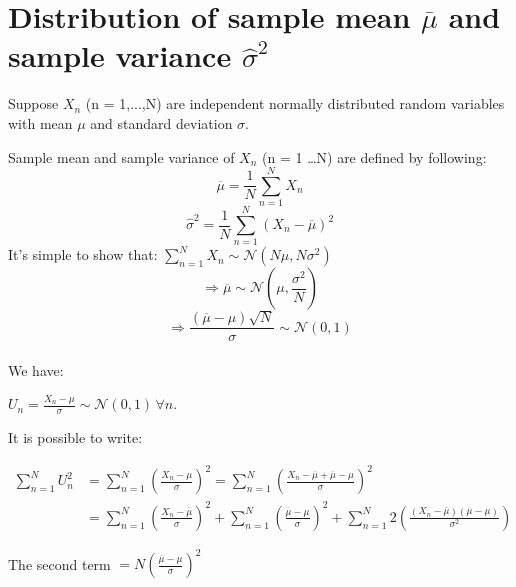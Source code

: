 \section {Distribution of sample mean $\overline \mu$ and sample variance $\hat{\sigma}^2$ } \label{appendixd}

Suppose $X_n$ (n = 1,...,N) are independent normally distributed random variables with mean $\mu$ and standard deviation $\sigma$.

Sample mean and sample variance of $X_n$ (n = 1 \ldots N) are defined by following:
\begin{equation}
	\overline \mu = \frac{1}{N} \sum_{n=1}^N X_n
\end{equation}
\begin{equation}
	\hat{\sigma}^2 = \frac{1}{N} \sum_{n=1}^N (X_n - \overline \mu)^2
\end{equation}
It's simple to show that:
$ \sum_{n=1}^N X_n \sim \mathcal {N}(N\mu,N\sigma^2) $
\begin{equation} \label{eq:smean}
	\Rightarrow \overline \mu\sim \mathcal {N}(\mu,\frac{\sigma^2}{N})
\end{equation}
\begin{equation}
	\Rightarrow \frac{(\overline \mu - \mu)\sqrt{N}}{\sigma} \sim \mathcal {N}(0,1)
\end{equation}
\\
We have:

$U_n = \frac {X_n - \mu}{\sigma} \sim \mathcal {N}(0,1) \, \forall n$.


It is possible to write:

\begin{align}
	\sum_{n=1}^N U_n^2 & = \sum_{n=1}^N {\left( \frac {X_n - \mu}{\sigma}\right)}^2 = \sum_{n=1}^N {\left(\frac {X_n - \overline \mu + \overline \mu - \mu}{\sigma}\right)}^2 \nonumber \\
	& = \sum_{n=1}^N {\left(\frac {X_n - \overline \mu}{\sigma}\right)}^2 + \sum_{n=1}^N {\left(\frac {\overline \mu - \mu}{\sigma}\right)}^2 + \sum_{n=1}^N 2{\left( \frac {(X_n - \overline \mu)(\overline \mu - \mu)}{\sigma^2} \right)} \nonumber 
\end{align}

The second term $= N{(\frac {\overline \mu - \mu}{\sigma})}^2$

